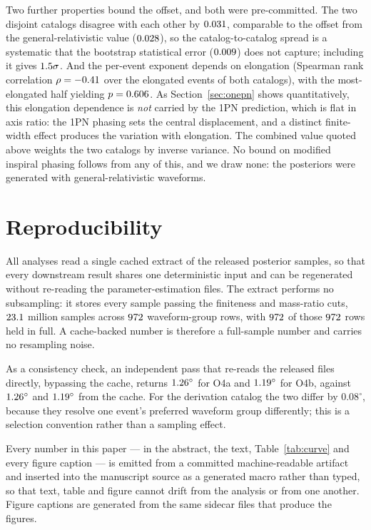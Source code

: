 \documentclass[aps,prd,twocolumn,amsmath,amssymb,nofootinbib,superscriptaddress]{revtex4-2}
\begin{document}
Two further properties bound the offset, and both were pre-committed. The two disjoint catalogs disagree
with each other by $0.031$, comparable to the offset from the general-relativistic value
($0.028$), so the catalog-to-catalog spread is a systematic that the bootstrap statistical error
($0.009$) does not capture; including it gives $1.5\sigma$. And the per-event exponent
depends on elongation (Spearman rank correlation $\rho = -0.41$ over the elongated events of both
catalogs), with the most-elongated half yielding $p=0.606$. As Section~\ref{sec:onepn} shows
quantitatively, this elongation dependence is \emph{not} carried by the 1PN prediction, which is flat in
axis ratio: the 1PN phasing sets the central displacement, and a distinct finite-width effect produces the
variation with elongation. The combined value quoted above weights the two catalogs by inverse variance.
No bound on modified inspiral phasing follows from any of this, and we draw none: the posteriors were
generated with general-relativistic waveforms.

\section{Reproducibility}
\label{app:repro}
All analyses read a single cached extract of the released posterior samples, so that every downstream
result shares one deterministic input and can be regenerated without re-reading the parameter-estimation
files. The extract performs no subsampling: it stores every sample passing the finiteness and mass-ratio
cuts, $23.1$ million samples across $972$ waveform-group rows, with $972$ of
those $972$ rows held in full. A cache-backed number is therefore a full-sample number and carries
no resampling noise.

As a consistency check, an independent pass that re-reads the released files directly, bypassing the cache,
returns $1.26^\circ$ for O4a and $1.19^\circ$ for O4b, against $1.26^\circ$ and
$1.19^\circ$ from the cache. For the derivation catalog the two differ by $0.08^\circ$, because
they resolve one event's preferred waveform group differently; this is a selection convention rather than
a sampling effect.

Every number in this paper --- in the abstract, the text, Table~\ref{tab:curve} and every figure caption
--- is emitted from a committed machine-readable artifact and inserted into the manuscript source as a
generated macro rather than typed, so that text, table and figure cannot drift from the analysis or from
one another. Figure captions are generated from the same sidecar files that produce the figures.
\end{document}
